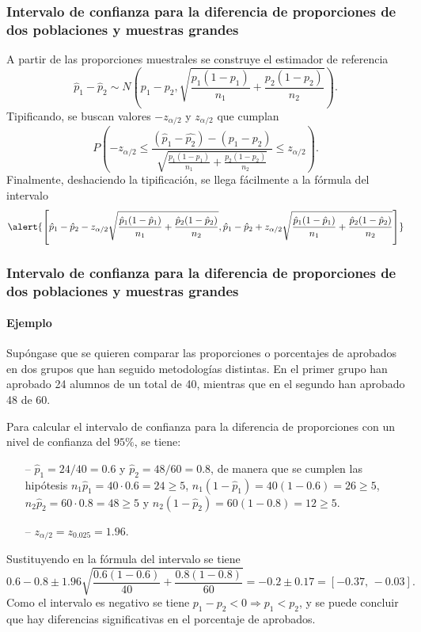 \begin{frame}
\frametitle{Intervalo de confianza para la diferencia de proporciones de dos poblaciones y muestras grandes}
A partir de las proporciones muestrales se construye el estimador de referencia
\[
\hat{p}_1-\hat{p}_2\sim  N\left(p_1-p_2,\sqrt{\frac{p_1(1-p_1)}{n_1}+\frac{p_2(1-p_2)}{n_2}}\right).
\]
Tipificando, se buscan valores $-z_{\alpha/2}$ y $z_{\alpha/2}$ que cumplan
\[
P\left(-z_{\alpha/2}\leq \frac{(\hat{p}_1-\hat{p_2})-(p_1-p_2)}{\sqrt{\frac{p_1(1-p_1)}{n_1}+\frac{p_2(1-p_2)}{n_2}}}\leq z_{\alpha/2} \right).
\]
Finalmente, deshaciendo la tipificación, se llega fácilmente a la fórmula del intervalo
\[
\alert{\left[\hat{p}_1-\hat{p}_2-z_{\alpha/2}\sqrt{\frac{\hat{p}_1(1-\hat{p}_1)}{n_1}+\frac{\hat{p}_2(1-\hat{p}_2)}{n_2}},\hat{p}_1-\hat{p}_2+z_{\alpha/2}\sqrt{\frac{\hat{p}_1(1-\hat{p}_1)}{n_1}+\frac{\hat{p}_2(1-\hat{p}_2)}{n_2}}\right]}
\]
\end{frame}


\begin{frame}
\frametitle{Intervalo de confianza para la diferencia de proporciones de dos poblaciones y muestras grandes}
\framesubtitle{Ejemplo}
Supóngase que se quieren comparar las proporciones o porcentajes de aprobados en dos grupos que han seguido metodologías distintas.
En el primer grupo han aprobado 24 alumnos de un total de 40, mientras que en el segundo han aprobado 48 de 60.

Para calcular el intervalo de confianza para la diferencia de proporciones con un nivel de confianza del $95\%$, se tiene:
\begin{itemize}
\item[--] $\hat{p}_1=24/40= 0.6$ y $\hat{p}_2=48/60=0.8$, de manera que se cumplen las hipótesis $n_1\hat{p}_1=40\cdot 0.6=24\geq 5$, $n_1(1-\hat{p}_1)=40(1-0.6)=26\geq 5$, $n_2\hat{p}_2=60\cdot 0.8 =48\geq 5$ y $n_2(1-\hat{p}_2)=60(1-0.8)=12\geq 5$.
\item[--] $z_{\alpha/2}=z_{0.025}= 1.96$.
\end{itemize}
Sustituyendo en la fórmula del intervalo se tiene
\[
0.6-0.8\pm 1.96 \sqrt{\frac{0.6(1-0.6)}{40}+\frac{0.8(1-0.8)}{60}} = -0.2\pm 0.17 = [-0.37,\, -0.03].
\]
Como el intervalo es negativo se tiene $p_1-p_2<0\Rightarrow p_1<p_2$, y se puede concluir que hay diferencias significativas en el porcentaje de aprobados.
\end{frame}
